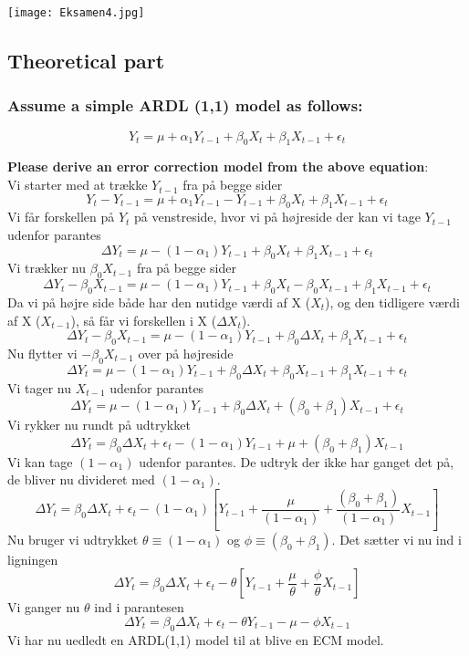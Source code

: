 \documentclass[
  10pt,
]{article}
\begin{document}
\texttt{[image: Eksamen4.jpg]} \newpage

\hypertarget{theoretical-part}{%
\subsection{Theoretical part}\label{theoretical-part}}

\hypertarget{assume-a-simple-ardl-11-model-as-follows}{%
\subsubsection{Assume a simple ARDL (1,1) model as
follows:}\label{assume-a-simple-ardl-11-model-as-follows}}

\[Y_t = \mu + \alpha_1Y_{t-1} + \beta_0X_t + \beta_1X_{t-1} + \epsilon_t \]

\textbf{Please derive an error correction model from the above equation}:\\
Vi starter med at trække \(Y_{t-1}\) fra på begge sider
\[Y_t - Y_{t-1} = \mu + \alpha_1Y_{t-1}- Y_{t-1} + \beta_0X_t + \beta_1X_{t-1} + \epsilon_t \]
Vi får forskellen på \(Y_t\) på venstreside, hvor vi på højreside der
kan vi tage \(Y_{t-1}\) udenfor parantes
\[\Delta Y_t = \mu - (1 - \alpha_1)Y_{t-1} + \beta_0X_t + \beta_1X_{t-1} + \epsilon_t \]
Vi trækker nu \(\beta_0X_{t-1}\) fra på begge sider
\[\Delta Y_t - \beta_0X_{t-1} = \mu - (1 - \alpha_1)Y_{t-1} + \beta_0X_t - \beta_0X_{t-1} + \beta_1X_{t-1} + \epsilon_t \]
Da vi på højre side både har den nutidge værdi af X (\(X_t\)), og den
tidligere værdi af X (\(X_{t-1}\)), så får vi forskellen i X
(\(\Delta X_t\)).
\[\Delta Y_t - \beta_0X_{t-1} = \mu - (1 - \alpha_1)Y_{t-1} + \beta_0\Delta X_t + \beta_1X_{t-1} + \epsilon_t \]
Nu flytter vi \(- \beta_0X_{t-1}\) over på højreside
\[\Delta Y_t = \mu - (1 - \alpha_1)Y_{t-1} + \beta_0\Delta X_t+ \beta_0X_{t-1} + \beta_1X_{t-1} + \epsilon_t \]
Vi tager nu \(X_{t-1}\) udenfor parantes
\[\Delta Y_t = \mu - (1 - \alpha_1)Y_{t-1} + \beta_0\Delta X_t+ (\beta_0 + \beta_1)X_{t-1} + \epsilon_t \]
Vi rykker nu rundt på udtrykket
\[\Delta Y_t = \beta_0\Delta X_t  + \epsilon_t  - (1 - \alpha_1)Y_{t-1}+ \mu + (\beta_0 + \beta_1)X_{t-1} \]
Vi kan tage \((1 - \alpha_1)\) udenfor parantes. De udtryk der ikke har
ganget det på, de bliver nu divideret med \((1 - \alpha_1)\).
\[\Delta Y_t = \beta_0\Delta X_t  + \epsilon_t  - (1 - \alpha_1)[Y_{t-1}+ \frac{\mu}{(1 - \alpha_1)} + \frac{(\beta_0 + \beta_1)}{(1 - \alpha_1)}X_{t-1}] \]
Nu bruger vi udtrykket \(\theta \equiv (1 - \alpha_1)\) og
\(\phi \equiv (\beta_0 + \beta_1)\). Det sætter vi nu ind i ligningen
\[\Delta Y_t = \beta_0\Delta X_t  + \epsilon_t  - \theta[Y_{t-1}+ \frac{\mu}{\theta} + \frac{\phi}{\theta}X_{t-1}] \]
Vi ganger nu \(\theta\) ind i parantesen
\[\Delta Y_t = \beta_0\Delta X_t  + \epsilon_t  - \theta Y_{t-1} - \mu - \phi X_{t-1} \]
Vi har nu uedledt en ARDL(1,1) model til at blive en ECM model.
\end{document}

